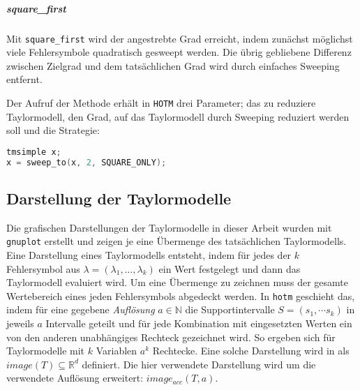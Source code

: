 \subparagraph{square\_first}
Mit \verb+square_first+ wird der angestrebte Grad erreicht, indem zunächst möglichst viele Fehlersymbole quadratisch gesweept werden. Die übrig gebliebene Differenz zwischen Zielgrad und dem tatsächlichen Grad wird durch einfaches Sweeping entfernt.

Der Aufruf der Methode erhält in \verb+HOTM+ drei Parameter; das zu reduziere Taylormodell, den Grad, auf das Taylormodell durch Sweeping reduziert werden soll und die Strategie:

 \begin{lstlisting}[language=C++, style=cpp, caption=Beispielaufruf der Sweeping-Routine,captionpos=b,xleftmargin=15pt]
tmsimple x;
x = sweep_to(x, 2, SQUARE_ONLY);
\end{lstlisting}



\subsection{Darstellung der Taylormodelle}
\label{sec:darstellung}
Die grafischen Darstellungen der Taylormodelle in dieser Arbeit wurden mit \verb+gnuplot+ \cite{gnuplot} erstellt und zeigen je eine Übermenge des tatsächlichen Taylormodells. Eine Darstellung eines Taylormodells entsteht, indem für jedes der $k$ Fehlersymbol aus $\lambda=(\lambda_1, \dots, \lambda_k)$ ein Wert festgelegt und dann das Taylormodell evaluiert wird. Um eine Übermenge zu zeichnen muss der gesamte Wertebereich eines jeden Fehlersymbols abgedeckt werden. In \verb+hotm+ geschieht das, indem für eine gegebene \textit{Auflösung} $a \in \mathbb{N}$ die Supportintervalle $S=(s_1, \cdots s_k)$ in jeweils $a$ Intervalle geteilt und für jede Kombination mit eingesetzten Werten ein von den anderen unabhängiges Rechteck gezeichnet wird. So ergeben sich für Taylormodelle mit $k$ Variablen $a^k$ Rechtecke. Eine solche Darstellung wird in \cite{DBLP:conf/macis/BrausseKM15} als $image(T) \subseteq \mathbb{R}^d$ definiert. Die hier verwendete Darstellung wird um die verwendete Auflösung erweitert: $image_{acc}(T,a)$.


